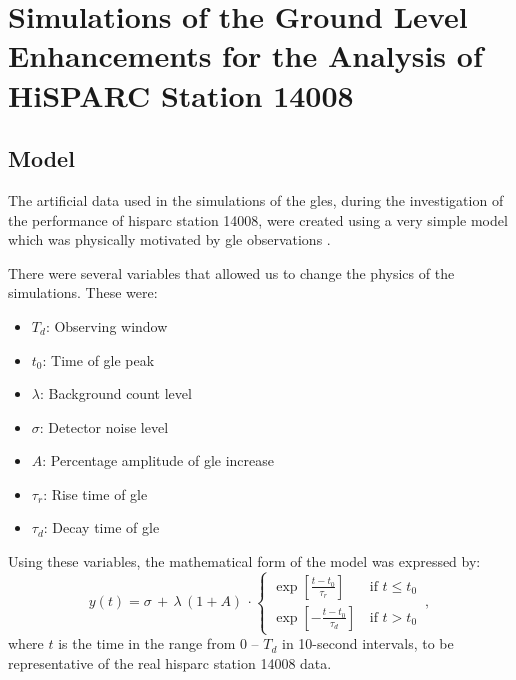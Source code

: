 \chapter{Simulations of the Ground Level Enhancements for the Analysis of HiSPARC Station 14008}\label{app:GLE_sims}


\section{Model}

The artificial data used in the simulations of the \glspl{gle}, during the investigation of the performance of \gls{hisparc} station 14008, were created using a very simple model which was physically motivated by \gls{gle} observations \citep{strauss_pulse_2017}.

There were several variables that allowed us to change the physics of the simulations. These were:

\begin{itemize}
	\item{{\bf $T_d$}: Observing window}
	\item{{\bf $t_0$}: Time of \gls{gle} peak}
	\item{{\bf $\lambda$}}: Background count level
	\item{{\bf $\sigma$}}: Detector noise level
	\item{{\bf $A$}: Percentage amplitude of \gls{gle} increase}
	\item{{\bf $\tau_r$}: Rise time of \gls{gle}}
	\item{{\bf $\tau_d$}: Decay time of \gls{gle}}
\end{itemize}

Using these variables, the mathematical form of the model was expressed by:
%
\begin{equation}
    y(t) =  \sigma \, + \, \lambda \, (1 + A) \, \cdot 
\begin{cases}

\exp\left[{\frac{t - t_0}{\tau_r}}\right] \,  & \text{if           $t \leq t_0$} \\

\exp\left[{-\frac{t - t_0}{\tau_d}}\right] \,  & \text{if           $t > t_0$} 

\end{cases} \, ,
\label{eq:GLE_model}
\end{equation}
%
where $t$ is the time in the range from 0 -- $T_d$ in 10-second intervals, to be representative of the real \gls{hisparc} station 14008 data.

